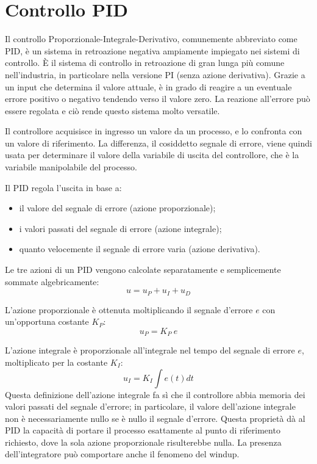 \documentclass[laurea,oneside,11pt]{USiena_tesiLM}
\begin{document}
\section{Controllo PID}
Il controllo Proporzionale-Integrale-Derivativo, comunemente abbreviato come PID, è un sistema in retroazione negativa ampiamente impiegato nei sistemi di controllo. È il sistema di controllo in retroazione di gran lunga più comune nell'industria, in particolare nella versione PI (senza azione derivativa). Grazie a un input che determina il valore attuale, è in grado di reagire a un eventuale errore positivo o negativo tendendo verso il valore zero. La reazione all'errore può essere regolata e ciò rende questo sistema molto versatile.

Il controllore acquisisce in ingresso un valore da un processo, e lo confronta con un valore di riferimento. La differenza, il cosiddetto segnale di errore, viene quindi usata per determinare il valore della variabile di uscita del controllore, che è la variabile manipolabile del processo.

Il PID regola l'uscita in base a:
\begin{itemize}
\item il valore del segnale di errore (azione proporzionale);
\item i valori passati del segnale di errore (azione integrale);
\item quanto velocemente il segnale di errore varia (azione derivativa).
\end{itemize}

Le tre azioni di un PID vengono calcolate separatamente e semplicemente sommate algebricamente:
\begin{equation}
u=u_P + u_I + u_D 
\end{equation}

L'azione proporzionale è ottenuta moltiplicando il segnale d'errore $e$ con un'opportuna costante $K_P$:
\begin{equation}
u_P = K_P \ e
\end{equation}

L'azione integrale è proporzionale all'integrale nel tempo del segnale di errore $e$, moltiplicato per la costante $K_I$:
\begin{equation}
u_I = K_I \int e(t) dt
\end{equation}
Questa definizione dell'azione integrale fa sì che il controllore abbia memoria dei valori passati del segnale d'errore; in particolare, il valore dell'azione integrale non è necessariamente nullo se è nullo il segnale d'errore. Questa proprietà dà al PID la capacità di portare il processo esattamente al punto di riferimento richiesto, dove la sola azione proporzionale risulterebbe nulla. La presenza dell'integratore può comportare anche il fenomeno del windup.
\end{document}
